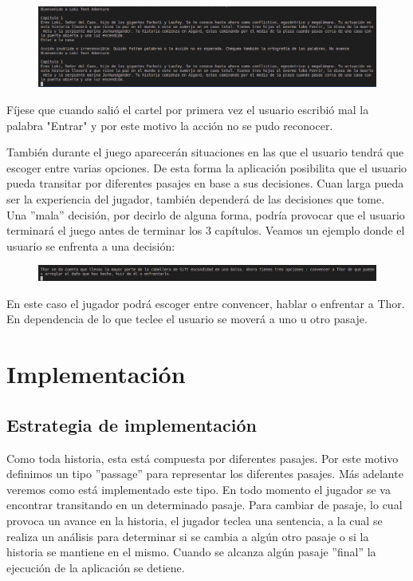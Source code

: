 \documentclass[12pt]{article}
\begin{document}
\begin{figure}[h]
	\begin{center}
		\includegraphics[width =15.0cm]{./img/No_avance.png}
	\end{center}
\end{figure}

F\'ijese que cuando sali\'o el cartel por primera vez el usuario escribi\'o mal la palabra "Entrar" y por este motivo la acci\'on no se pudo reconocer. 

Tambi\'en durante el juego aparecer\'an situaciones en las que el usuario tendr\'a que escoger entre varias opciones. De esta forma la aplicaci\'on posibilita que el usuario pueda transitar por diferentes pasajes en base a sus decisiones. Cuan larga pueda ser la experiencia del jugador, tambi\'en depender\'a de las decisiones que tome. Una ''mala'' decisi\'on, por decirlo de alguna forma, podr\'ia provocar que el usuario terminar\'a el juego antes de terminar los 3 cap\'itulos. Veamos un ejemplo donde el usuario se enfrenta a una decisi\'on: 

\begin{figure}[h]
	\begin{center}
		\includegraphics[width =15.0cm]{./img/Decision.png}
	\end{center}
\end{figure}

En este caso el jugador podr\'a escoger entre convencer, hablar o enfrentar a Thor. En dependencia de lo que teclee el usuario se mover\'a a uno u otro pasaje.

\section{Implementaci\'on}

\subsection{Estrategia de implementaci\'on}

Como toda historia, esta est\'a compuesta por diferentes pasajes. Por este motivo definimos un tipo ''passage'' para representar los diferentes pasajes. M\'as adelante veremos como est\'a implementado este tipo. En todo momento el jugador se va encontrar transitando en un determinado pasaje. Para cambiar de pasaje, lo cual provoca un avance en la historia, el jugador teclea una sentencia, a la cual se realiza un an\'alisis para determinar si se cambia a alg\'un otro pasaje o si la historia se mantiene en el mismo. Cuando se alcanza alg\'un pasaje ''final'' la ejecuci\'on de la aplicaci\'on se detiene.
\end{document}
